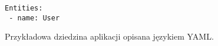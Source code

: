 \begin{figure}[!ht]
\begin{verbatim}
Entities:
 - name: User
\end{verbatim}

\caption{Przykładowa dziedzina aplikacji opisana językiem YAML.}
\label{fig:implementation_core:yaml}
\end{figure}
